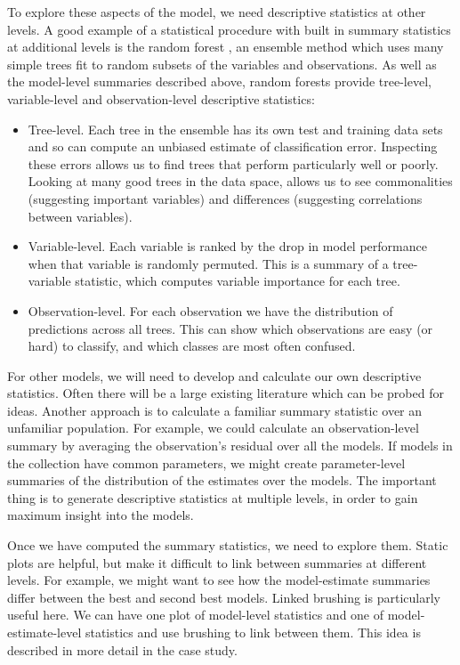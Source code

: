 \documentclass[preprint]{imsart}
\begin{document}
To explore these aspects of the model, we need descriptive statistics at other levels. A good example of a statistical procedure with built in summary statistics at additional levels is the random forest \citep{breiman:2001}, an ensemble method which uses many simple trees fit to random subsets of the variables and observations. As well as the model-level summaries described above, random forests provide tree-level, variable-level and observation-level descriptive statistics:

\begin{itemize}
  \item Tree-level.  Each tree in the ensemble has its own test and training data sets and so can compute an unbiased estimate of classification error.  Inspecting these errors allows us to find trees that perform particularly well or poorly.  Looking at many good trees in the data space, allows us to see commonalities (suggesting important variables) and differences (suggesting correlations between variables).

  \item Variable-level.  Each variable is ranked by the drop in model performance when that variable is randomly permuted. This is a summary of a tree-variable statistic, which computes variable importance for each tree.

  \item Observation-level.  For each observation we have the distribution of predictions across all trees.  This can show which observations are easy (or hard) to classify, and which classes are most often confused.

\end{itemize}

For other models, we will need to develop and calculate our own descriptive statistics. Often there will be a large existing literature which can be probed for ideas. Another approach is to calculate a familiar summary statistic over an unfamiliar population. For example, we could calculate an observation-level summary by averaging the observation's residual over all the models. If models in the collection have common parameters, we might create parameter-level summaries of the distribution of the estimates over the models. The important thing is to generate descriptive statistics at multiple levels, in order to gain maximum insight into the models.

Once we have computed the summary statistics, we need to explore them. Static plots are helpful, but make it difficult to link between summaries at different levels. For example, we might want to see how the model-estimate summaries differ between the best and second best models. Linked brushing is particularly useful here. We can have one plot of model-level statistics and one of model-estimate-level statistics and use brushing to link between them. This idea is described in more detail in the case study.
\end{document}
